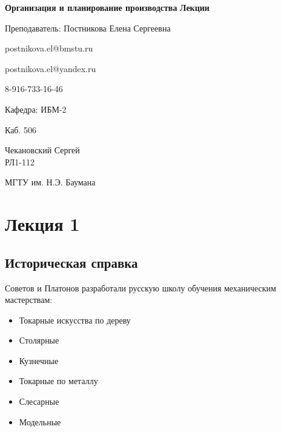 \documentclass[14pt,a4paper,oneside]{extarticle}
\begin{document}


\begin{titlepage}
    \begin{center}
        \vspace*{1cm}

        \Huge
        \textbf{Организация и планирование производства}
        \textbf{Лекции}

        \vspace{0.5cm}
        \LARGE
        Преподаватель: Постникова Елена Сергеевна

        postnikova.el@bmstu.ru

        postnikova.el@yandex.ru

        8-916-733-16-46


        \vspace{1.5cm}

        Кафедра: ИБМ-2

        Каб. 506

        \vfill

        Чекановский Сергей\\
        РЛ1-112

        \vspace{0.8cm}


        \Large
        МГТУ им. Н.Э. Баумана

    \end{center}
\end{titlepage}

\tableofcontents

\clearpage

\section{Лекция 1}

\subsection{Историческая справка}

Советов и Платонов разработали русскую школу обучения механическим мастерствам:

\begin{itemize}
    \item Токарные искусства по дереву
    \item Столярные
    \item Кузнечные
    \item Токарные по металлу
    \item Слесарные
    \item Модельные
\end{itemize}
\end{document}
